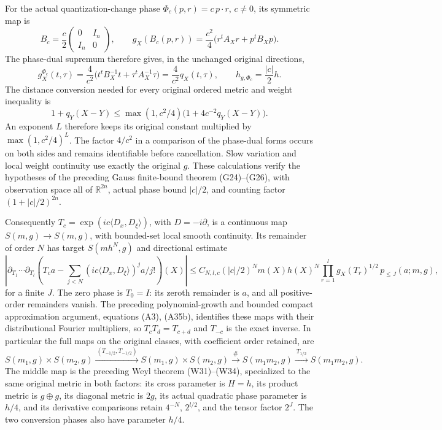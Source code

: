 \documentclass[
  11pt,
]{article}
\begin{document}
For the actual quantization-change phase \(\Phi_c(p,r)=c\,p\cdot r\),
\(c\ne0\), its symmetric map is \[
 B_c=\frac c2\begin{pmatrix}0&I_n\\I_n&0\end{pmatrix},\qquad
 g_X(B_c(p,r))=\frac{c^2}{4}
 \big(r^tA_Xr+p^tB_Xp\big).
\] The phase-dual supremum therefore gives, in the unchanged original
directions, \[
 g_X^{\Phi_c}(t,\tau)=\frac4{c^2}
 \big(t^tB_X^{-1}t+\tau^tA_X^{-1}\tau\big)
 =\frac4{c^2}q_X(t,\tau),\qquad
 h_{g,\Phi_c}=\frac{|c|}{2}h.
 \tag{P261.2}
\] The distance conversion needed for every original ordered metric and
weight inequality is \[
 1+q_Y(X-Y)\le\max(1,c^2/4)
 \big(1+4c^{-2}q_Y(X-Y)\big).
 \tag{P261.3}
\] An exponent \(L\) therefore keeps its original constant multiplied by
\(\max(1,c^2/4)^L\). The factor \(4/c^2\) in a comparison of the
phase-dual forms occurs on both sides and remains identifiable before
cancellation. Slow variation and local weight continuity use exactly the
original \(g\). These calculations verify the hypotheses of the
preceding Gauss finite-bound theorem (G24)--(G26), with observation
space all of \(\mathbb R^{2n}\), actual phase bound \(|c|/2\), and
counting factor \((1+|c|/2)^{2n}\).

Consequently \(T_c=\exp(ic\langle D_x,D_\xi\rangle)\), with
\(D=-i\partial\), is a continuous map \(S(m,g)\to S(m,g)\), with
bounded-set local smooth continuity. Its remainder of order \(N\) has
target \(S(mh^N,g)\) and directional estimate \[
 |\partial_{T_1}\cdots\partial_{T_l}
 (T_ca-\sum_{j<N}(ic\langle D_x,D_\xi\rangle)^ja/j!)(X)|
 \le C_{N,l,c}(|c|/2)^N m(X)h(X)^N
 \prod_{r=1}^lg_X(T_r)^{1/2}\,p_{\le J}(a;m,g),
 \tag{P261.4}
\] for a finite \(J\). The zero phase is \(T_0=I\): its zeroth remainder
is \(a\), and all positive-order remainders vanish. The preceding
polynomial-growth and bounded compact approximation argument, equations
(A3), (A35b), identifies these maps with their distributional Fourier
multipliers, so \(T_cT_d=T_{c+d}\) and \(T_{-c}\) is the exact inverse.
In particular the full maps on the original classes, with coefficient
order retained, are \[
 S(m_1,g)\times S(m_2,g)
 \xrightarrow{\ (T_{-1/2},T_{-1/2})\ }
 S(m_1,g)\times S(m_2,g)
 \xrightarrow{\ \#\ }S(m_1m_2,g)
 \xrightarrow{\ T_{1/2}\ }S(m_1m_2,g).
 \tag{P261.5}
\] The middle map is the preceding Weyl theorem (W31)--(W34),
specialized to the same original metric in both factors: its cross
parameter is \(H=h\), its product metric is \(g\oplus g\), its diagonal
metric is \(2g\), its actual quadratic phase parameter is \(h/4\), and
its derivative comparisons retain \(4^{-N}\), \(2^{l/2}\), and the
tensor factor \(2^J\). The two conversion phases also have parameter
\(h/4\).
\end{document}

